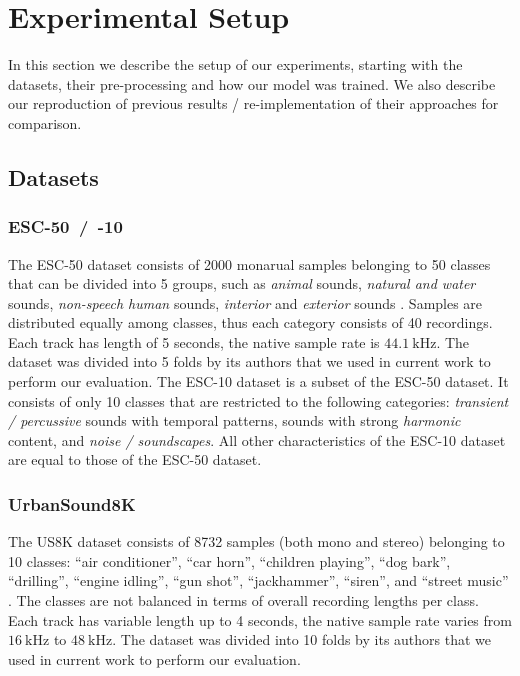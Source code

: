\documentclass[a4paper,conference]{IEEEtran}
\begin{document}
\section{Experimental Setup} \label{sec:exp}
In this section we describe the setup of our experiments, starting with the datasets, their pre-processing and how our model was trained.
We also describe our reproduction of previous results / re-implementation of their approaches for comparison.

\subsection{Datasets} \label{ssec:datasets}
\subsubsection{\mbox{ESC-50 / -10}}
The \mbox{ESC-50} dataset consists of 2000 monarual samples belonging to 50 classes that can be divided into 5 groups, such as \emph{animal} sounds, \emph{natural and water} sounds, \emph{non-speech human} sounds, \emph{interior} and \emph{exterior} sounds \cite{piczak2015esc}.
Samples are distributed equally among classes, thus each category consists of 40 recordings.
Each track has length of 5 seconds, the native sample rate is $44.1\:\si{\kilo\hertz}$.
The dataset was divided into 5 folds by its authors that we used in current work to perform our evaluation.
The \mbox{ESC-10} dataset is a subset of the \mbox{ESC-50} dataset.
It consists of only 10 classes that are restricted to the following categories: \emph{transient / percussive} sounds with temporal patterns, sounds with strong \emph{harmonic} content, and \emph{noise / soundscapes}.
All other characteristics of the \mbox{ESC-10} dataset are equal to those of the \mbox{ESC-50} dataset.

\subsubsection{UrbanSound8K} \label{sssec:us8k}
The US8K dataset consists of 8732 samples (both mono and stereo) belonging to 10 classes: ``air conditioner'', ``car horn'', ``children playing'', ``dog bark'', ``drilling'', ``engine idling'', ``gun shot'', ``jackhammer'', ``siren'', and ``street music'' \cite{salamon2014us8k}.
The classes are not balanced in terms of overall recording lengths per class.
Each track has variable length up to 4 seconds, the native sample rate varies from $16\:\si{\kilo\hertz}$ to $48\:\si{\kilo\hertz}$.
The dataset was divided into 10 folds by its authors that we used in current work to perform our evaluation.
\end{document}
